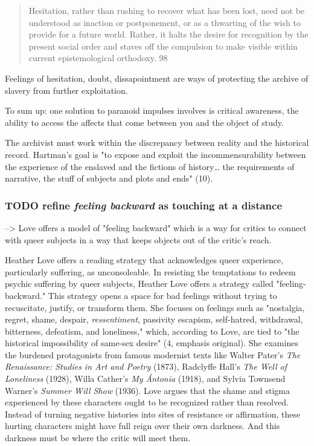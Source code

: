 \documentclass[11pt]{article}
\begin{document}
\begin{quote}
Hesitation, rather than rushing to recover what has been
lost, need not be understood as inaction or postponement, or as a
thwarting of the wish to provide for a future world. Rather, it halts
the desire for recognition by the present social order and staves off
the compulsion to make visible within current epistemological
orthodoxy. 98
\end{quote}

Feelings of hesitation, doubt, dissapointment are ways of protecting
the archive of slavery from further exploitation.

To sum up: one solution to paranoid impulses involves is critical
awareness, the ability to access the affects that come between you and
the object of study. 

The archivist must work within the discrepancy between reality and the
historical record. Hartman's goal is "to expose and exploit the
incommensurability between the experience of the enslaved and the
fictions of history\ldots{} the requirements of narrative, the stuff of
subjects and plots and ends" (10).
\subsubsection{{\bfseries\sffamily TODO} refine \emph{feeling backward} as touching at a distance}
\label{sec:org13cf3b8}
--> Love offers a model of "feeling backward" which is a way for critics
to connect with queer subjects in a way that keeps objects out of the
critic's reach. 

Heather Love offers a reading strategy that acknowledges queer
experience, particularly suffering, as unconsoleable. In resisting the
temptations to redeem psychic suffering by queer subjects, Heather
Love offers a strategy called "feeling-backward." This strategy opens
a space for bad feelings without trying to recuscitate, justify, or
transform them. She focuses on feelings such as "nostalgia, regret,
shame, despair, \emph{ressentiment}, passivity escapism, self-hatred,
withdrawal, bitterness, defeatism, and loneliness," which, according
to Love, are tied to "the historical impossibility of same-sex desire"
(4, emphasis original). She examines the burdened protagonists from
famous modernist texts like Walter Pater's \emph{The Renaissance: Studies
in Art and Poetry} (1873), Radclyffe Hall's \emph{The Well of Loneliness}
(1928), Willa Cather's \emph{My Ántonia} (1918), and Sylvia Townsend
Warner's \emph{Summer Will Show} (1936). Love argues that the shame and
stigma experienced by these characters ought to be recognized rather
than resolved. Instead of turning negative histories into sites of
resistance or affirmation, these hurting characters might have full
reign over their own darkness. And this darkness must be where the
critic will meet them.
\end{document}
